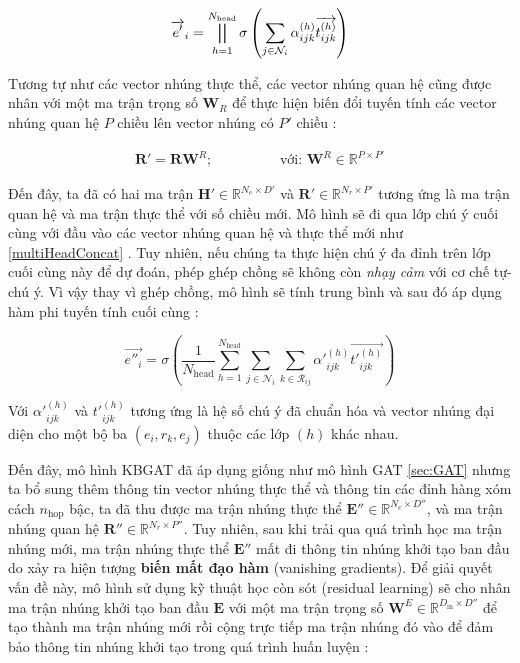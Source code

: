 \begin{equation}
	\label{eq:graphAttention1}
	\overrightarrow{e'}_i=\bigparallel_{h=1}^{N_{\text{head}}} \sigma\left(\sum_{j\in \mathcal{N}_i}\alpha_{ijk}^{(h)} \overrightarrow{t^{(h)}_{ijk}}\right)
\end{equation}

Tương tự như các vector nhúng thực thể, các vector nhúng quan hệ cũng được nhân với một ma trận trọng số $\mathbf{W}_R$ để thực hiện biến đổi tuyến tính các vector nhúng quan hệ $P$ chiều lên vector nhúng có $P'$ chiều :

\begin{align}
	\mathbf{R'} = \mathbf{R} \mathbf{W}^R; \hspace{2cm} \text{với: } \mathbf{W}^R \in \mathbb{R}^{P \times P'}
\end{align}

Đến đây, ta đã có hai ma trận $\mathbf{H}' \in \mathbb{R}^{N_e \times D'}$ và $\mathbf{R}' \in \mathbb{R}^{N_r \times P'}$ tương ứng là ma trận quan hệ và ma trận thực thể với số chiều mới. Mô hình sẽ đi qua lớp chú ý cuối cùng với đầu vào các vector nhúng quan hệ và thực thể mới như \ref{multiHeadConcat} . Tuy nhiên, nếu chúng ta thực hiện chú ý đa đỉnh trên lớp cuối cùng này để dự đoán, phép ghép chồng sẽ không còn \textit{nhạy cảm} với cơ chế tự-chú ý. Vì vậy thay vì ghép chồng, mô hình sẽ tính trung bình và sau đó áp dụng hàm phi tuyến tính cuối cùng :

\begin{equation}
	\label{eq:graphAttention2}
	\overrightarrow{e''_{i}}=\sigma\left(\frac{1}{N_{\text{head}}} \sum_{h=1}^{N_{\text{head}}} \sum_{j \in \mathcal{N}_i} \sum_{k \in \mathcal{R}_{ij}} \alpha'^{(h)}_{ijk} \overrightarrow{t'^{(h)}_{ijk}} \right)
\end{equation}

Với $\alpha'^{(h)}_{ijk}$ và $t'^{(h)}_{ijk}$ tương ứng là hệ số chú ý đã chuẩn hóa và vector nhúng đại diện cho một bộ ba $(e_i, r_k, e_j)$ thuộc các lớp $(h)$ khác nhau.

Đến đây, mô hình KBGAT đã áp dụng giống như mô hình GAT \ref{sec:GAT} nhưng ta bổ sung thêm thông tin vector nhúng thực thể và thông tin các đỉnh hàng xóm cách $n_{\text{hop}}$ bậc, ta đã thu được ma trận nhúng thực thể $\mathbf{E}'' \in \mathbb{R}^{N_e \times D''}$, và ma trận nhúng quan hệ $\mathbf{R}'' \in \mathbb{R}^{N_r \times P''}$. Tuy nhiên, sau khi trải qua quá trình học ma trận nhúng mới, ma trận nhúng thực thể $\mathbf{E}''$ mất đi thông tin nhúng khởi tạo ban đầu do xảy ra hiện tượng \textbf{biến mất đạo hàm} (vanishing gradients). Để giải quyết vấn đề này, mô hình sử dụng kỹ thuật học còn sót (residual learning) sẽ cho nhân ma trận nhúng khởi tạo ban đầu $\mathbf{E}$ với một ma trận trọng số $\mathbf{W}^E \in \mathbb{R}^{D_{\text{in}} \times D''}$ để tạo thành ma trận nhúng mới rồi cộng trực tiếp ma trận nhúng đó vào để đảm bảo thông tin nhúng khởi tạo trong quá trình huấn luyện :

